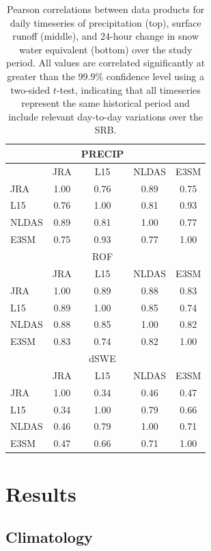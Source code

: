 \documentclass[nhess, manuscript]{copernicus}
\begin{document}
\begin{table}[]
\caption{Pearson correlations between data products for daily timeseries of precipitation (top), surface runoff (middle), and 24-hour change in snow water equivalent (bottom) over the study period. All values are correlated significantly at greater than the 99.9\% confidence level using a two-sided $t$-test, indicating that all timeseries represent the same historical period and include relevant day-to-day variations over the SRB.}
\begin{tabular}{lcccc}
 \hline
      &      & PRECIP &       &       \\ \hline 
      & JRA  & L15    & NLDAS & E3SM \\
JRA   & 1.00 & 0.76   & 0.89  & 0.75 \\
L15   & 0.76 & 1.00   & 0.81  & 0.93 \\
NLDAS & 0.89 & 0.81   & 1.00  & 0.77 \\
E3SM  & 0.75 & 0.93   & 0.77  & 1.00  \\ \hline \hline
      &      & ROF    &       &      \\ \hline 
      & JRA  & L15    & NLDAS & E3SM \\
JRA   & 1.00 & 0.89   & 0.88  & 0.83 \\
L15   & 0.89 & 1.00   & 0.85  & 0.74 \\
NLDAS & 0.88 & 0.85   & 1.00  & 0.82 \\
E3SM  & 0.83 & 0.74   & 0.82  & 1.00 \\ \hline \hline
      &      & dSWE   &       &      \\ \hline 
      & JRA  & L15    & NLDAS & E3SM \\
JRA   & 1.00 & 0.34   & 0.46  & 0.47 \\
L15   & 0.34 & 1.00   & 0.79  & 0.66 \\
NLDAS & 0.46 & 0.79   & 1.00  & 0.71 \\
E3SM  & 0.47 & 0.66   & 0.71  & 1.00 \\ \hline \hline
\end{tabular}
\label{table:correlations}
\end{table}

\section{Results}

\subsection{Climatology}
\end{document}
